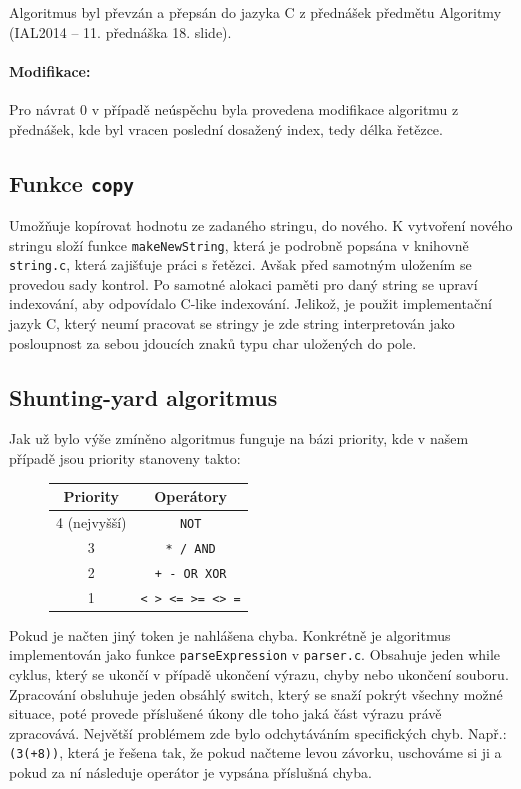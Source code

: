 \documentclass[12pt,a4paper,titlepage,final]{article}
\begin{document}
Algoritmus byl převzán a přepsán do jazyka C z přednášek předmětu Algoritmy (IAL2014
\cite{honzik2} -- 11. přednáška 18. slide).
 
\paragraph{Modifikace:} Pro návrat 0 v případě neúspěchu byla provedena modifikace
algoritmu z přednášek, kde byl vracen poslední dosažený index, tedy délka řetězce.

\subsection{Funkce \texttt{copy}}
Umožňuje kopírovat hodnotu ze zadaného stringu, do nového. K vytvoření nového stringu složí funkce \verb|makeNewString|, která je podrobně popsána v knihovně \verb|string.c|, která zajišťuje práci s řetězci. Avšak před samotným uložením se provedou sady kontrol. %
Po samotné alokaci paměti pro daný string se upraví indexování, aby odpovídalo C-like indexování. Jelikož, je použit implementační jazyk C, který neumí pracovat se stringy je zde string interpretován jako posloupnost za sebou jdoucích znaků typu char uložených do pole.

\subsection{Shunting-yard algoritmus}\label{sya_popis}
Jak už bylo výše zmíněno algoritmus funguje na bázi priority, kde v našem případě jsou priority stanoveny takto:

\begin{figure}[h!]
\centering
\begin{tabular}{| c | c |}
	\hline
	\textbf{Priority} & \textbf{Operátory} \\ \hline \hline
    4 (nejvyšší) & \texttt{NOT}  \\ \hline
    3 & \texttt{* / AND} \\ \hline
    2 & \texttt{+ - OR XOR}  \\ \hline
    1 & \texttt{< > <= >= <> =}  \\ \hline
\end{tabular}
\end{figure}

Pokud je načten jiný token je nahlášena chyba. Konkrétně je algoritmus implementován jako funkce \verb|parseExpression| v \verb|parser.c|. Obsahuje jeden while cyklus, který se ukončí v případě ukončení výrazu, chyby nebo ukončení souboru. Zpracování obsluhuje jeden obsáhlý switch, který se snaží pokrýt všechny možné situace, poté provede příslušené úkony dle toho jaká část výrazu právě zpracovává. Největší problémem zde bylo odchytáváním specifických chyb. Např.: \verb|(3(+8))|, která je řešena tak, že pokud načteme levou závorku, uschováme si ji a pokud za ní následuje operátor je vypsána příslušná chyba.
\end{document}
